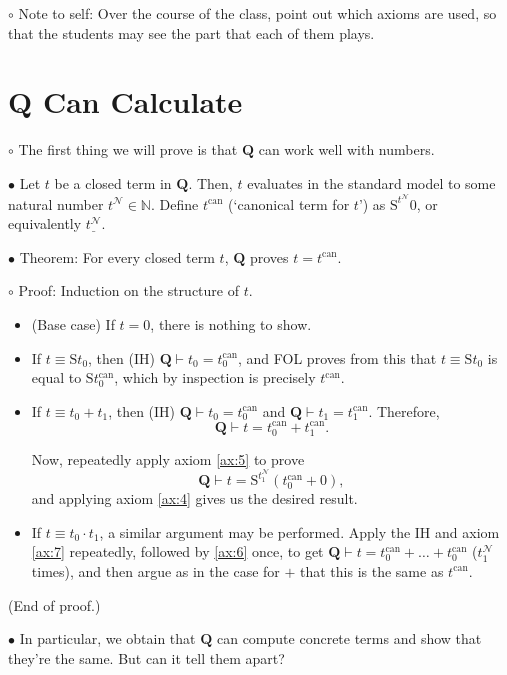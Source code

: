 \documentclass{article}
\newcommand{\N}{\mathbb{N}}
\newcommand{\RQ}{\mathbf{Q}}
\newcommand{\TN}{\mathcal{N}}
\newcommand{\suc}{\mathrm{S}}
\newcommand{\can}{\mathrm{can}}
\newcommand\Point[1]{\noindent \hspace{\labelsep} {
$\bullet$ #1} \smallskip}
\newcommand\point[1]{\noindent \hspace{\labelsep} {\small $\circ$ #1} \smallskip}
\newcommand\timestamp[1]{}
\newcommand\proofend{\hfill(End of proof.)}
\begin{document}
\point{Note to self: Over the course of the class, point out which axioms are used, so that the students may see the part that each of them plays.}

\timestamp{5 min}

\section{$\RQ$ Can Calculate}

\point{The first thing we will prove is that $\RQ$ can work well with numbers.}

\Point{Let $t$ be a closed term in $\RQ$. Then, $t$ evaluates in the standard model to some natural number $t^\TN \in \N$. Define $t^\can$ (`canonical term for $t$') as $\suc^{t^\TN}0$, or equivalently $\underline{t^\TN}$.}

\Point{Theorem: For every closed term $t$, $\RQ$ proves $t = t^\can$.}

\point{Proof: Induction on the structure of $t$.
\begin{itemize}
\item (Base case) If $t = 0$, there is nothing to show.
\item If $t \equiv \suc t_0$, then (IH) $\RQ \vdash t_0 = t_0^\can$, and FOL proves from this that $t \equiv \suc t_0$ is equal to $\suc t_0^\can$, which by inspection is precisely $t^\can$.
\item If $t \equiv t_0 + t_1$, then (IH) $\RQ \vdash t_0 = t_0^\can$ and $\RQ \vdash t_1 = t_1^\can$. Therefore,
\begin{equation}
\RQ \vdash t = t_0^\can + t_1^\can.
\end{equation} 

Now, repeatedly apply axiom \ref{ax:5} to prove
\begin{equation}
\RQ \vdash t = \suc^{t_1^\TN}(t_0^\can + 0),
\end{equation}
and applying axiom \ref{ax:4} gives us the desired result.
\item If $t \equiv t_0 \cdot t_1$, a similar argument may be performed. Apply the IH and axiom \ref{ax:7} repeatedly, followed by \ref{ax:6} once, to get $\RQ \vdash t = t_0^\can + \dots + t_0^\can$ ($t_1^\TN$ times), and then argue as in the case for $+$ that this is the same as $t^\can$.
\end{itemize}
\proofend}

\timestamp{15 min}

\Point{In particular, we obtain that $\RQ$ can compute concrete terms and show that they're the same. But can it tell them apart?}
\end{document}
